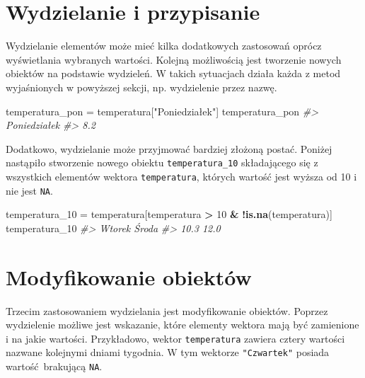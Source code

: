 \documentclass[paper=6in:9in,pagesize=pdftex,headinclude=on,footinclude=on,10pt]{scrbook}
\newenvironment{Shaded}{\begin{snugshade}}{\end{snugshade}}
\newcommand{\CommentTok}[1]{\textcolor[rgb]{0.56,0.35,0.01}{\textit{#1}}}
\newcommand{\DecValTok}[1]{\textcolor[rgb]{0.00,0.00,0.81}{#1}}
\newcommand{\KeywordTok}[1]{\textcolor[rgb]{0.13,0.29,0.53}{\textbf{#1}}}
\newcommand{\NormalTok}[1]{#1}
\newcommand{\OperatorTok}[1]{\textcolor[rgb]{0.81,0.36,0.00}{\textbf{#1}}}
\newcommand{\StringTok}[1]{\textcolor[rgb]{0.31,0.60,0.02}{#1}}
\begin{document}
\hypertarget{wip-vector}{%
\section{Wydzielanie i przypisanie}\label{wip-vector}}

Wydzielanie elementów może mieć kilka dodatkowych zastosowań oprócz wyświetlania wybranych wartości.
Kolejną możliwością jest tworzenie nowych obiektów na podstawie wydzieleń.
W takich sytuacjach działa każda z metod wyjaśnionych w powyższej sekcji, np. wydzielenie przez nazwę.

\begin{Shaded}
\begin{Highlighting}[]
\NormalTok{temperatura_pon =}\StringTok{ }\NormalTok{temperatura[}\StringTok{"Poniedziałek"}\NormalTok{]}
\NormalTok{temperatura_pon}
\CommentTok{#> Poniedziałek }
\CommentTok{#>          8.2}
\end{Highlighting}
\end{Shaded}

Dodatkowo, wydzielanie może przyjmować bardziej złożoną postać.
Poniżej nastąpiło stworzenie nowego obiektu \texttt{temperatura\_10} składającego się z wszystkich elementów wektora \texttt{temperatura}, których wartość jest wyższa od 10 i nie jest \texttt{NA}.

\begin{Shaded}
\begin{Highlighting}[]
\NormalTok{temperatura_}\DecValTok{10}\NormalTok{ =}\StringTok{ }\NormalTok{temperatura[temperatura }\OperatorTok{>}\StringTok{ }\DecValTok{10} \OperatorTok{&}\StringTok{ }\OperatorTok{!}\KeywordTok{is.na}\NormalTok{(temperatura)]}
\NormalTok{temperatura_}\DecValTok{10}
\CommentTok{#> Wtorek  Środa }
\CommentTok{#>   10.3   12.0}
\end{Highlighting}
\end{Shaded}

\hypertarget{mo-vector}{%
\section{Modyfikowanie obiektów}\label{mo-vector}}

Trzecim zastosowaniem wydzielania jest modyfikowanie obiektów.
Poprzez wydzielenie możliwe jest wskazanie, które elementy wektora mają być zamienione i na jakie wartości.
Przykładowo, wektor \texttt{temperatura} zawiera cztery wartości nazwane kolejnymi dniami tygodnia.
W tym wektorze \texttt{"Czwartek"} posiada wartość~brakującą \texttt{NA}.
\end{document}

